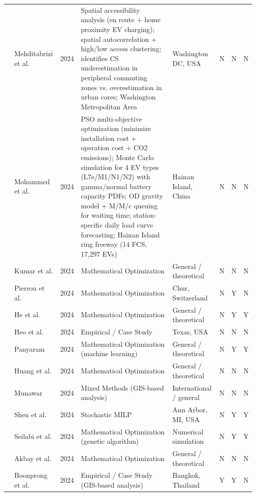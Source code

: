 \documentclass[letterpaper, 12pt, oneside, doublespacing]{Thesis}
\begin{document}
\begin{longtable}{L{0.9cm} L{1.8cm} L{0.7cm} L{2.5cm} L{2.1cm} L{0.7cm} L{0.7cm} L{0.7cm}}
\cite{integrating_en_2024} & Mehditabrizi et al. & 2024 & Spatial accessibility analysis (en route + home proximity EV charging); spatial autocorrelation + high/low access clustering; identifies CS underestimation in peripheral commuting zones vs. overestimation in urban cores; Washington Metropolitan Area & Washington DC, USA & N & N & N \\
\cite{multiobjective_optimization_2024} & Mohammed et al. & 2024 & PSO multi-objective optimization (minimize installation cost + operation cost + CO2 emissions); Monte Carlo simulation for 4 EV types (L7e/M1/N1/N2) with gamma/normal battery capacity PDFs; OD gravity model + M/M/c queuing for waiting time; station-specific daily load curve forecasting; Hainan Island ring freeway (14 FCS, 17,297 EVs) & Hainan Island, China & N & N & N \\
\cite{optimal_electric_2024} & Kumar et al. & 2024 & Mathematical Optimization & General {\slash} theoretical & N & N & N \\
\cite{optimal_ev_2024} & Pierrou et al. & 2024 & Mathematical Optimization & Chur, Switzerland & N & Y & N \\
\cite{optimal_evcs_2024} & He et al. & 2024 & Mathematical Optimization & General {\slash} theoretical & N & Y & Y \\
\cite{optimal_planning_2024} & Heo et al. & 2024 & Empirical / Case Study & Texas, USA & N & N & N \\
\cite{optimization_strategies_2024} & Panyaram & 2024 & Mathematical Optimization (machine learning) & General {\slash} theoretical & N & Y & Y \\
\cite{optimizing_ev_2024} & Huang et al. & 2024 & Mathematical Optimization & General {\slash} theoretical & N & N & N \\
\cite{optimizing_urban_2024} & Munawar & 2024 & Mixed Methods (GIS-based analysis) & International {\slash} general & N & N & N \\
\cite{sequential_charging_2024} & Shen et al. & 2024 & Stochastic MILP & Ann Arbor, MI, USA & N & Y & Y \\
\cite{sustainable_planning_2024} & Seilabi et al. & 2024 & Mathematical Optimization (genetic algorithm) & Numerical simulation & N & Y & Y \\
\cite{the_electric_2024} & Akbay et al. & 2024 & Mathematical Optimization & General {\slash} theoretical & N & N & N \\
\cite{towards_sustainable_2024} & Boonprong et al. & 2024 & Empirical / Case Study (GIS-based analysis) & Bangkok, Thailand & Y & Y & N \\

\end{longtable}
\end{document}
